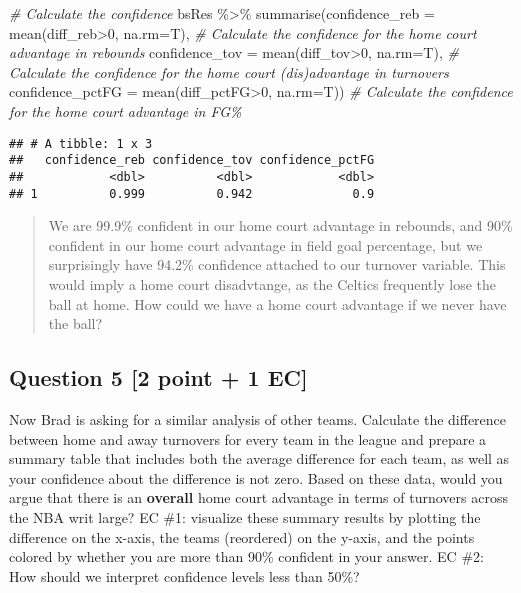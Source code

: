 \documentclass[
]{article}
\newenvironment{Shaded}{\begin{snugshade}}{\end{snugshade}}
\newcommand{\AttributeTok}[1]{\textcolor[rgb]{0.77,0.63,0.00}{#1}}
\newcommand{\CommentTok}[1]{\textcolor[rgb]{0.56,0.35,0.01}{\textit{#1}}}
\newcommand{\DecValTok}[1]{\textcolor[rgb]{0.00,0.00,0.81}{#1}}
\newcommand{\FunctionTok}[1]{\textcolor[rgb]{0.00,0.00,0.00}{#1}}
\newcommand{\NormalTok}[1]{#1}
\newcommand{\SpecialCharTok}[1]{\textcolor[rgb]{0.00,0.00,0.00}{#1}}
\begin{document}
\begin{Shaded}
\begin{Highlighting}[]
\CommentTok{\# Calculate the confidence}
\NormalTok{bsRes }\SpecialCharTok{\%\textgreater{}\%}
  \FunctionTok{summarise}\NormalTok{(}\AttributeTok{confidence\_reb =} \FunctionTok{mean}\NormalTok{(diff\_reb}\SpecialCharTok{\textgreater{}}\DecValTok{0}\NormalTok{, }\AttributeTok{na.rm=}\NormalTok{T), }\CommentTok{\# Calculate the confidence for the home court advantage in rebounds}
            \AttributeTok{confidence\_tov =} \FunctionTok{mean}\NormalTok{(diff\_tov}\SpecialCharTok{\textgreater{}}\DecValTok{0}\NormalTok{, }\AttributeTok{na.rm=}\NormalTok{T), }\CommentTok{\# Calculate the confidence for the home court (dis)advantage in turnovers}
            \AttributeTok{confidence\_pctFG =} \FunctionTok{mean}\NormalTok{(diff\_pctFG}\SpecialCharTok{\textgreater{}}\DecValTok{0}\NormalTok{, }\AttributeTok{na.rm=}\NormalTok{T)) }\CommentTok{\# Calculate the confidence for the home court advantage in FG\%}
\end{Highlighting}
\end{Shaded}

\begin{verbatim}
## # A tibble: 1 x 3
##   confidence_reb confidence_tov confidence_pctFG
##            <dbl>          <dbl>            <dbl>
## 1          0.999          0.942              0.9
\end{verbatim}

\begin{quote}
We are 99.9\% confident in our home court advantage in rebounds, and
90\% confident in our home court advantage in field goal percentage, but
we surprisingly have 94.2\% confidence attached to our turnover
variable. This would imply a home court disadvtange, as the Celtics
frequently lose the ball at home. How could we have a home court
advantage if we never have the ball?
\end{quote}

\hypertarget{question-5-2-point-1-ec}{%
\subsection{Question 5 {[}2 point + 1
EC{]}}\label{question-5-2-point-1-ec}}

Now Brad is asking for a similar analysis of other teams. Calculate the
difference between home and away turnovers for every team in the league
and prepare a summary table that includes both the average difference
for each team, as well as your confidence about the difference is not
zero. Based on these data, would you argue that there is an
\textbf{overall} home court advantage in terms of turnovers across the
NBA writ large? EC \#1: visualize these summary results by plotting the
difference on the x-axis, the teams (reordered) on the y-axis, and the
points colored by whether you are more than 90\% confident in your
answer. EC \#2: How should we interpret confidence levels less than
50\%?
\end{document}
